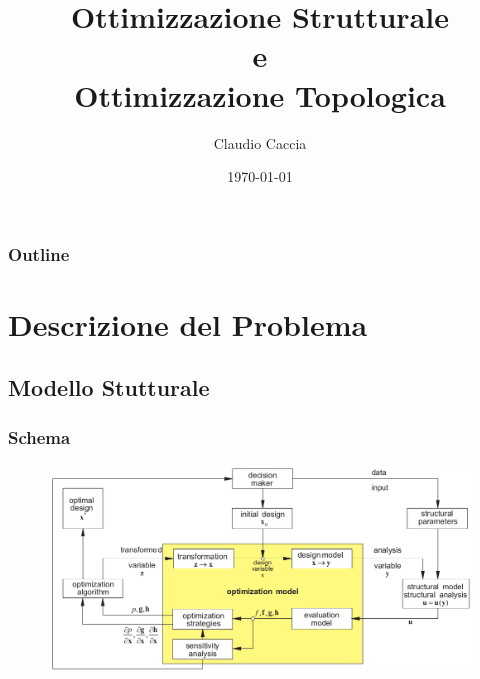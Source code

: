 \documentclass{beamer}
\title[Structural Optimization]{Ottimizzazione Strutturale \\
	e \\
	Ottimizzazione Topologica } %
\author{Claudio Caccia} %
\institute[Polimi] %
{
Progetto di Strutture Aerospaziali \\ %
\medskip
\textit{Politecnico di Milano} %
}
\date{\today} %
\begin{document}
\begin{frame}
\titlepage %
\end{frame}

\begin{frame}
\frametitle{Outline} %
\tableofcontents[hideallsubsections]
\end{frame}


\section{Descrizione del Problema} %

\subsection{Modello Stutturale}

\begin{frame}
	\frametitle{Schema}
	\begin{figure}
		\includegraphics[width=0.8\linewidth]{./images/schema.png}
	\end{figure}
\end{frame}
\end{document}
